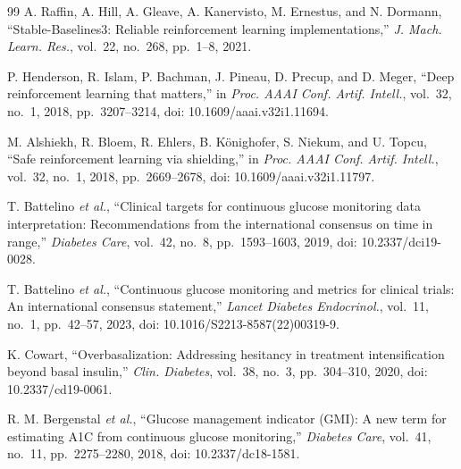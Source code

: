 \documentclass[conference]{IEEEtran}
\begin{document}
\begin{thebibliography}{99}
 A. Raffin, A. Hill, A. Gleave, A. Kanervisto, M. Ernestus, and
N. Dormann, ``Stable-Baselines3: Reliable reinforcement learning implementations,'' \emph{J.
Mach. Learn. Res.}, vol.~22, no.~268, pp.~1--8, 2021.

 P. Henderson, R. Islam, P. Bachman, J. Pineau, D. Precup, and
D. Meger, ``Deep reinforcement learning that matters,'' in \emph{Proc. AAAI Conf. Artif.
Intell.}, vol.~32, no.~1, 2018, pp.~3207--3214, doi: 10.1609/aaai.v32i1.11694.

 M. Alshiekh, R. Bloem, R. Ehlers, B. K\"onighofer, S. Niekum, and
U. Topcu, ``Safe reinforcement learning via shielding,'' in \emph{Proc. AAAI Conf. Artif.
Intell.}, vol.~32, no.~1, 2018, pp.~2669--2678, doi: 10.1609/aaai.v32i1.11797.

 T. Battelino \emph{et al.}, ``Clinical targets for continuous glucose
monitoring data interpretation: Recommendations from the international consensus on time in
range,'' \emph{Diabetes Care}, vol.~42, no.~8, pp.~1593--1603, 2019, doi: 10.2337/dci19-0028.

 T. Battelino \emph{et al.}, ``Continuous glucose monitoring and metrics
for clinical trials: An international consensus statement,'' \emph{Lancet Diabetes
Endocrinol.}, vol.~11, no.~1, pp.~42--57, 2023, doi: 10.1016/S2213-8587(22)00319-9.

 K. Cowart, ``Overbasalization: Addressing hesitancy in treatment
intensification beyond basal insulin,'' \emph{Clin. Diabetes}, vol.~38, no.~3, pp.~304--310,
2020, doi: 10.2337/cd19-0061.

 R. M. Bergenstal \emph{et al.}, ``Glucose management indicator (GMI):
A new term for estimating A1C from continuous glucose monitoring,'' \emph{Diabetes Care},
vol.~41, no.~11, pp.~2275--2280, 2018, doi: 10.2337/dc18-1581.

\end{thebibliography}
\end{document}
